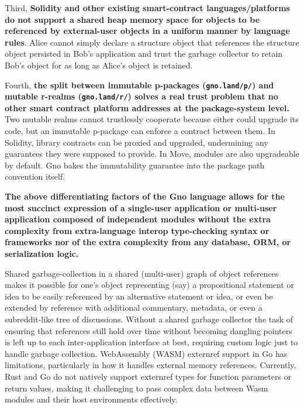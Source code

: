 \documentclass[12pt,a4paper]{article}
\newcommand{\passthrough}[1]{#1}
\begin{document}
Third, \textbf{Solidity and other existing smart-contract
languages/platforms do not support a shared heap memory space for
objects to be referenced by external-user objects in a uniform manner by
language rules}. Alice cannot simply declare a structure object that
references the structure object persisted in Bob's application and trust
the garbage collector to retain Bob's object for as long as Alice's
object is retained.

Fourth, \textbf{the split between immutable p-packages
(\passthrough{\lstinline!gno.land/p/!}) and mutable r-realms
(\passthrough{\lstinline!gno.land/r/!}) solves a real trust problem that
no other smart contract platform addresses at the package-system level.}
Two mutable realms cannot trustlessly cooperate because either could
upgrade its code, but an immutable p-package can enforce a contract
between them. In Solidity, library contracts can be proxied and
upgraded, undermining any guarantees they were supposed to provide. In
Move, modules are also upgradeable by default. Gno bakes the
immutability guarantee into the package path convention itself.

\textbf{The above differentiating factors of the Gno language allows for
the most succinct expression of a single-user application or multi-user
application composed of independent modules without the extra complexity
from extra-language interop type-checking syntax or frameworks nor of
the extra complexity from any database, ORM, or serialization logic.}

Shared garbage-collection in a shared (multi-user) graph of object
references makes it possible for one's object representing (say) a
propositional statement or idea to be easily referenced by an
alternative statement or idea, or even be extended by reference with
additional commentary, metadata, or even a subreddit-like tree of
discussions. Without a shared garbage collector the task of ensuring
that references still hold over time without becoming dangling pointers
is left up to each inter-application interface at best, requiring custom
logic just to handle garbage collection. WebAssembly (WASM) externref
support in Go has limitations, particularly in how it handles external
memory references. Currently, Rust and Go do not natively support
externref types for function parameters or return values, making it
challenging to pass complex data between Wasm modules and their host
environments effectively.
\end{document}
